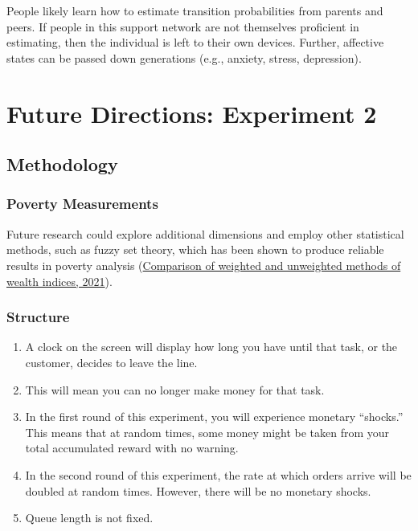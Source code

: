 \documentclass[
]{report}
\begin{document}
People likely learn how to estimate transition probabilities from
parents and peers. If people in this support network are not themselves
proficient in estimating, then the individual is left to their own
devices. Further, affective states can be passed down generations (e.g.,
anxiety, stress, depression).

\hypertarget{future-directions-experiment-2}{%
\chapter{Future Directions: Experiment
2}\label{future-directions-experiment-2}}

\hypertarget{methodology-2}{%
\section{Methodology}\label{methodology-2}}

\hypertarget{poverty-measurements}{%
\subsection{Poverty Measurements}\label{poverty-measurements}}

Future research could explore additional dimensions and employ other
statistical methods, such as fuzzy set theory, which has been shown to
produce reliable results in poverty analysis
(\href{https://www.ncbi.nlm.nih.gov/pmc/articles/PMC7921812/}{Comparison
of weighted and unweighted methods of wealth indices, 2021}).

\hypertarget{structure-2}{%
\subsection{Structure}\label{structure-2}}

\begin{enumerate}
\def\labelenumi{\arabic{enumi}.}
\item
  A clock on the screen will display how long you have until that task,
  or the customer, decides to leave the line.
\item
  This will mean you can no longer make money for that task.
\item
  In the first round of this experiment, you will experience monetary
  ``shocks.'' This means that at random times, some money might be taken
  from your total accumulated reward with no warning.
\item
  In the second round of this experiment, the rate at which orders
  arrive will be doubled at random times. However, there will be no
  monetary shocks.
\item
  Queue length is not fixed.
\end{enumerate}
\end{document}
